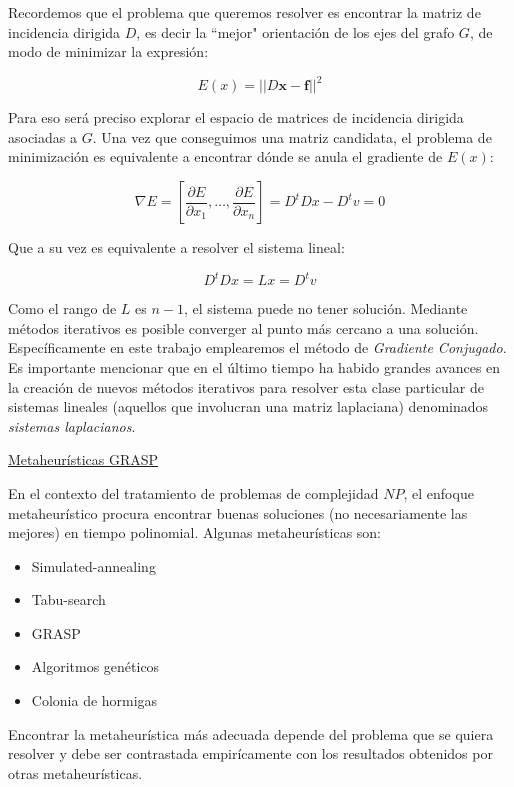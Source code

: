 \documentclass[a4paper,11pt]{article}
\begin{document}
Recordemos que el problema que queremos resolver es encontrar la matriz 
de incidencia dirigida $D$, es decir la ``mejor" orientación de los ejes 
del grafo $G$, de modo de minimizar la expresión:

$$E(x) = ||D\bm{x}-\bm{f}||^2$$

Para eso será preciso explorar el espacio de matrices de 
incidencia dirigida asociadas a $G$. Una vez que conseguimos una 
matriz candidata, el problema de minimización es equivalente a encontrar
dónde se anula el gradiente de $E(x)$:
 
$$\nabla E = [\frac{\partial E}{\partial x_1}, \dots, \frac{\partial 
E}{\partial x_n}] = D^tDx-D^tv=0$$

Que a su vez es equivalente a resolver el sistema lineal:

$$D^tDx = Lx = D^tv$$

Como el rango de $L$ es $n-1$, el sistema puede no tener solución. 
Mediante métodos iterativos es posible converger al punto más cercano a 
una solución. Específicamente en este trabajo emplearemos el método de 
\textit{Gradiente Conjugado}. Es importante mencionar que en el último 
tiempo ha habido grandes avances en la creación de nuevos métodos 
iterativos para resolver esta clase particular de sistemas lineales 
(aquellos que involucran una matriz laplaciana) denominados 
\textit{sistemas laplacianos}.

\bigskip

\underline{Metaheurísticas GRASP}

\bigskip

En el contexto del tratamiento de problemas de complejidad $NP$, el 
enfoque metaheurístico procura encontrar buenas soluciones (no 
necesariamente las mejores) en tiempo polinomial. Algunas 
metaheurísticas son:

\begin{itemize}
	\item Simulated-annealing
	\item Tabu-search
	\item GRASP
	\item Algoritmos genéticos
	\item Colonia de hormigas
\end{itemize}

Encontrar la metaheurística más adecuada depende del problema que se 
quiera resolver y debe ser contrastada empirícamente con los resultados 
obtenidos por otras metaheurísticas.

\bigskip
\end{document}
